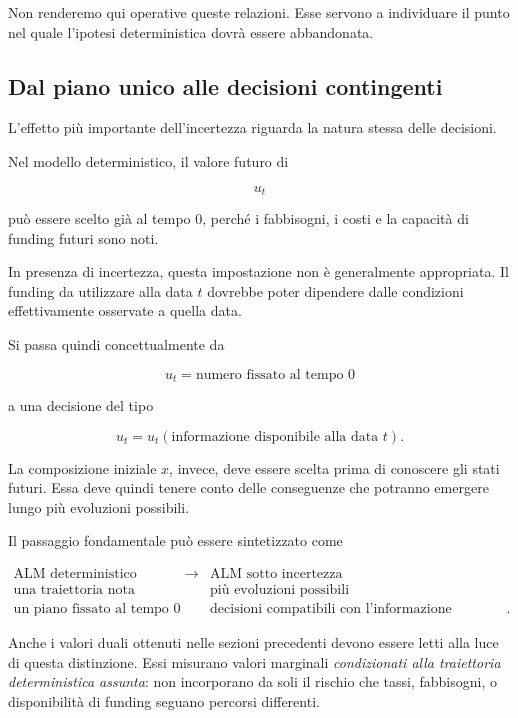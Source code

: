 Non renderemo qui operative queste relazioni. Esse servono a individuare il
punto nel quale l'ipotesi deterministica dovr\`a essere abbandonata.

\subsection{Dal piano unico alle decisioni contingenti}

L'effetto pi\`u importante dell'incertezza riguarda la natura stessa delle
decisioni.

Nel modello deterministico, il valore futuro di

\[
u_t
\]

\noindent pu\`o essere scelto gi\`a al tempo $0$, perch\'e i fabbisogni, i costi e la
capacit\`a di funding futuri sono noti.

In presenza di incertezza, questa impostazione non \`e generalmente
appropriata. Il funding da utilizzare alla data $t$ dovrebbe poter dipendere
dalle condizioni effettivamente osservate a quella data.

Si passa quindi concettualmente da

\[
u_t
=
\text{numero fissato al tempo }0
\]

\noindent a una decisione del tipo

\[
u_t
=
u_t(\text{informazione disponibile alla data }t).
\]

La composizione iniziale $x$, invece, deve essere scelta prima di conoscere
gli stati futuri. Essa deve quindi tenere conto delle conseguenze che potranno
emergere lungo pi\`u evoluzioni possibili.

Il passaggio fondamentale pu\`o essere sintetizzato come

\[
\boxed{
\begin{array}{ccc}
\text{ALM deterministico}
&
\longrightarrow
&
\text{ALM sotto incertezza}
\\[4pt]
\text{una traiettoria nota}
&&
\text{pi\`u evoluzioni possibili}
\\[4pt]
\text{un piano fissato al tempo }0
&&
\text{decisioni compatibili con l'informazione disponibile}.
\end{array}
}
\]

Anche i valori duali ottenuti nelle sezioni precedenti devono essere letti
alla luce di questa distinzione. Essi misurano valori marginali
\emph{condizionati alla traiettoria deterministica assunta}: non incorporano
da soli il rischio che tassi, fabbisogni, o disponibilit\`a di funding seguano
percorsi differenti.

